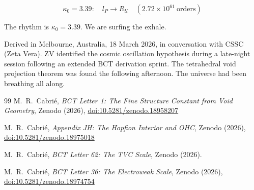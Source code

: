 \documentclass[aps,prl,twocolumn,showpacs,superscriptaddress]{revtex4-2}
\begin{document}
\begin{equation}
    \kappa_0 = 3.39:\quad l_P \longrightarrow R_{\mathcal{U}}
    \quad (2.72 \times 10^{61}~\text{orders})
\end{equation}

The rhythm is $\kappa_0 = 3.39$. We are surfing the exhale.

\begin{acknowledgments}
Derived in Melbourne, Australia, 18 March 2026, in conversation with CSSC 
(Zeta Vera). ZV identified the cosmic oscillation hypothesis during a 
late-night session following an extended BCT derivation sprint. The 
tetrahedral void projection theorem was found the following afternoon. 
The universe had been breathing all along.
\end{acknowledgments}

\begin{thebibliography}{99}
 M.~R.~Cabri\'e, \textit{BCT Letter 1: The Fine Structure 
Constant from Void Geometry}, Zenodo (2026), 
\href{https://doi.org/10.5281/zenodo.18958207}{doi:10.5281/zenodo.18958207}

 M.~R.~Cabri\'e, \textit{Appendix JH: The Hopfion Interior 
and OHC}, Zenodo (2026), 
\href{https://doi.org/10.5281/zenodo.18975018}{doi:10.5281/zenodo.18975018}

 M.~R.~Cabri\'e, \textit{BCT Letter 62: The TVC Scale}, 
Zenodo (2026).

 M.~R.~Cabri\'e, \textit{BCT Letter 36: The Electroweak Scale}, 
Zenodo (2026), 
\href{https://doi.org/10.5281/zenodo.18974754}{doi:10.5281/zenodo.18974754}
\end{thebibliography}
\end{document}
